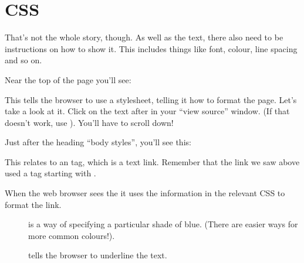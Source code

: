 \documentclass[letterpaper,10pt,english]{sphinxmanual}
\begin{document}
\section{CSS}
\label{\detokenize{web:css}}
That’s not the whole story, though. As well as the text, there also need to be
instructions on how to show it. This includes things like font, colour, line
spacing and so on.

Near the top of the page you’ll see:

\begin{sphinxVerbatim}[commandchars=\\\{\}]
    
\end{sphinxVerbatim}

This tells the browser to use a stylesheet, telling it how to format the page.
Let’s take a look at it. Click on the text after  in your
“view source” window. (If that doesn’t work, use
).
You’ll have to scroll down!

Just after the heading “body styles”, you’ll see this:

\begin{sphinxVerbatim}[commandchars=\\\{\}]
 
     
     
\end{sphinxVerbatim}

This relates to an  tag, which is a text link. Remember that the link we
saw above used a tag starting with .

When the web browser sees the  it uses the information
in the relevant CSS to format the link.
\begin{description}
\item[{}] \leavevmode
is a way of specifying
a particular shade of blue. (There are easier ways for more common colours!).

\item[{}] \leavevmode
tells the browser to underline the text.

\end{description}
\end{document}
